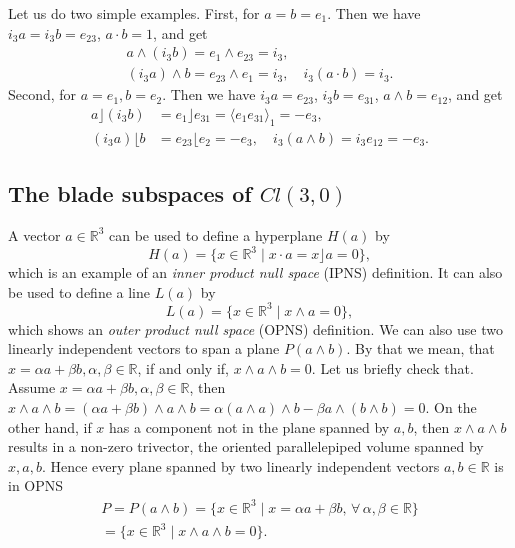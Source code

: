 \documentclass[cameraready]{jcmsi}%
\newcommand{\R}{\mathbb{R}}
\newcommand{\be}{\begin{equation}}
\newcommand{\ee}{\end{equation}}
\begin{document}
Let us do two simple examples. First, for $a=b=e_1$. 
Then we have $i_3a=i_3b=e_{23}$, $a\cdot b = 1$, and get
\begin{gather}  
  a \wedge (i_3b) = e_1 \wedge e_{23}=i_3,
  \nonumber \\
  (i_3a)\wedge b = e_{23}\wedge e_1 = i_3,
  \quad
  i_3(a \cdot b) = i_3.
\end{gather} 
Second, for $a=e_1, b=e_2$. 
Then we have $i_3a=e_{23}$, $i_3b=e_{31}$,  
$a \wedge b = e_{12}$, and get
\begin{align}  
  a \rfloor (i_3b) &= e_1 \rfloor e_{31} = \langle e_1 e_{31} \rangle_1 = -e_3,
  \\
  (i_3a) \lfloor b &= e_{23} \lfloor e_2 = -e_3,
  \quad
  i_3(a \wedge b) = i_3 e_{12} = -e_3.
  \nonumber 
\end{align}



\subsection{The blade subspaces of $Cl(3,0)$}


A vector $a\in \R^3$ can be used to define a hyperplane $H(a)$ by 
\be
  H(a) = \{x\in \R^3 \mid x \cdot a= x \rfloor a= 0 \}, 
\ee
which is an example of an \textit{inner product null space} (IPNS) definition. 
It can also be used to define a line $L(a)$ by 
\be 
  L(a) = \{x\in \R^3 \mid x \wedge a = 0 \}, 
\ee 
which shows an \textit{outer product null space} (OPNS) definition. 
We can also use two linearly independent vectors to span a plane $P(a\wedge b)$. By that we mean, that
$x = \alpha a + \beta b, \alpha, \beta \in \R$, if and only if, $x\wedge a\wedge b = 0$. 
Let us briefly check that. 
Assume $x = \alpha a + \beta b, \alpha, \beta \in \R$, then
$x\wedge a\wedge b 
= (\alpha a + \beta b)\wedge a \wedge b
=  \alpha (a\wedge a) \wedge b - \beta a \wedge (b \wedge b) = 0$.
On the other hand, if $x$ has a component not in the plane spanned by $a,b$, then $x\wedge a \wedge b$ results in a non-zero trivector, the oriented parallelepiped volume spanned by $x,a,b$. 
Hence every plane spanned by two linearly independent vectors $a,b \in \R$ is in OPNS
\begin{gather}
  P = P(a\wedge b) = \{x \in \R^3 \mid x = \alpha a + \beta b, \,\forall \,\alpha, \beta \in \R\}
  \nonumber \\
  = \{x\in \R^3 \mid x \wedge a \wedge b = 0\}.
  \label{eq:planeab}
\end{gather}
\end{document}
